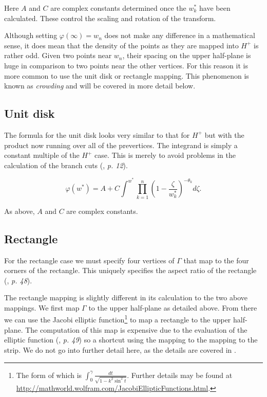 \documentclass[a4paper,10pt]{amsart}
\renewcommand{\phi}{\varphi}
\begin{document}
Here $A$ and $C$ are complex constants determined once the $w^*_k$ have been calculated. These control the scaling and rotation of the transform.

Although setting $\phi(\infty) = w_n$ does not make any difference in a mathematical sense, it does mean that the density of the points as they are mapped into $H^+$ is rather odd. Given two points near $w_n$, their spacing on the upper half-plane is huge in comparison to two points near the other vertices. For this reason it is more common to use the unit disk or rectangle mapping. This phenomenon is known as \emph{crowding} and will be covered in more detail below.

\subsection{Unit disk}

The formula for the unit disk looks very similar to that for $H^+$ but with the product now running over all of the prevertices. The integrand is simply a constant multiple of the $H^+$ case. This is merely to avoid problems in the calculation of the branch cuts (\cite{driscoll}, \emph{p. 12}).

\begin{equation}
\label{unitscmap}
\phi(w^*) = A + C \int^{w^*} \prod_{k=1}^{n} (1 - \frac{\zeta}{w^*_k})^{-\theta_k} d\zeta.
\end{equation}

As above, $A$ and $C$ are complex constants.

\subsection{Rectangle}
For the rectangle case we must specify four vertices of $\Gamma$ that map to the four corners of the rectangle. This uniquely specifies the aspect ratio of the rectangle (\cite{driscoll}, \emph{p. 48}).

The rectangle mapping is slightly different in its calculation to the two above mappings. We first map $\Gamma$ to the upper half-plane as detailed above. From there we can use the Jacobi elliptic function\footnote{The form of which is $\int_0^\gamma \frac{dt}{\sqrt{1-k^2\sin^2t}}$. Further details may be found at \url{http://mathworld.wolfram.com/JacobiEllipticFunctions.html}.} to map a rectangle to the upper half-plane. The computation of this map is expensive due to the evaluation of the elliptic function (\cite{driscoll}, \emph{p. 49}) so a shortcut using the mapping to the mapping to the strip. We do not go into further detail here, as the details are covered in \cite{howell90}.
\end{document}
